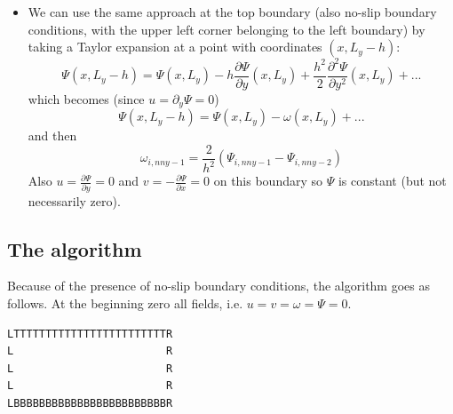 \begin{itemize}
\item We can use the same approach at the top boundary (also no-slip boundary conditions, with the upper left corner belonging to the left boundary) by taking a Taylor expansion at a point with coordinates $(x,L_y-h)$:
\[
\Psi(x,L_y-h) = \Psi(x,L_y) - h \frac{\partial \Psi}{\partial y}(x,L_y)  
+ \frac{h^2}{2}  \frac{\partial^2 \Psi}{\partial y^2} (x,L_y) + ...
\]
which becomes (since $u=\partial_y \Psi=0$)
\[
\Psi(x,L_y-h) = \Psi(x,L_y) 
-\omega (x,L_y) + ...
\]
and then
\begin{equation}
\omega_{i,nny-1} = \frac{2}{h^2} (\Psi_{i,nny-1} -\Psi_{i,nny-2} )  
\label{eq:omega4}
\end{equation}
Also $u=\frac{\partial \Psi}{\partial y}=0$ and $v=-\frac{\partial \Psi}{\partial x}=0$ on this boundary so $\Psi$ is constant (but not necessarily zero). 

\end{itemize}

\subsection*{The algorithm}




Because of the presence of no-slip boundary conditions, the algorithm goes as follows. 
At the beginning zero all fields, i.e. $u=v=\omega=\Psi=0$.

\begin{center}
\begin{verbatim}
LTTTTTTTTTTTTTTTTTTTTTTTTR
L                        R
L                        R 
L                        R 
LBBBBBBBBBBBBBBBBBBBBBBBBR
\end{verbatim}
\end{center}

